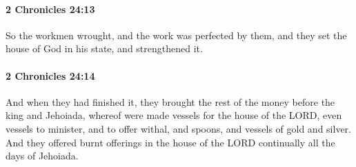 		\paragraph{2 Chronicles 24:13} %
			\label{2CHRONICLES-24-13}

			So the workmen wrought, and the work was perfected by them, and they set the house of God in his state, and strengthened it.


		\paragraph{2 Chronicles 24:14} %
			\label{2CHRONICLES-24-14}

			And when they had finished it, they brought the rest of the money before the king and Jehoiada, whereof were made vessels for the house of the LORD, even vessels to minister, and to offer withal, and spoons, and vessels of gold and silver. And they offered burnt offerings in the house of the LORD continually all the days of Jehoiada.

